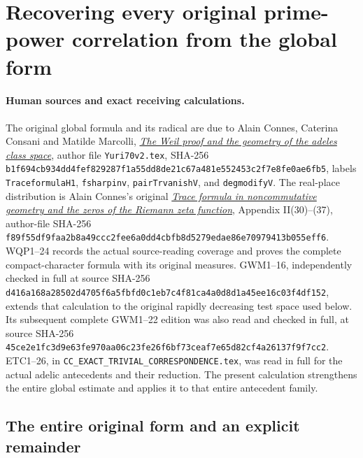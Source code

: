 \section{Recovering every original prime-power correlation from the global form}
\label{sec:global-weil-prime-frequency-recovery}

\paragraph{Human sources and exact receiving calculations.}
The original global formula and its radical are due to Alain Connes,
Caterina Consani and Matilde Marcolli,
\href{https://arxiv.org/abs/math/0703392v1}{\emph{The Weil proof and the
geometry of the adeles class space}}, author file
\nolinkurl{Yuri70v2.tex}, SHA-256
\nolinkurl{b1f694cb934dd4fef829287f1a55dd8de21c67a481e552453c2f7e8fe0ae6fb5},
labels \texttt{TraceformulaH1}, \texttt{fsharpinv},
\texttt{pairTrvanishV}, and \texttt{degmodifyV}.
The real-place distribution is Alain Connes's original
\href{https://arxiv.org/abs/math/9811068v1}{\emph{Trace formula in
noncommutative geometry and the zeros of the Riemann zeta function}},
Appendix II(30)--(37), author-file SHA-256
\nolinkurl{f89f55df9faa2b8a49ccc2fee6a0dd4cbfb8d5279edae86e70979413b055eff6}.
WQP1--24 records the actual source-reading coverage and proves the
complete compact-character formula with its original measures.
GWM1--16, independently checked in full at source SHA-256
\nolinkurl{d416a168a28502d4705f6a5fbfd0c1eb7c4f81ca4a0d8d1a45ee16c03f4df152},
extends that calculation to the original rapidly decreasing test
space used below. Its subsequent complete GWM1--22 edition was also
read and checked in full, at source SHA-256
\nolinkurl{45ce2e1fc3d9e63fe970aa06c23fe26f6bf73ceaf7e65d82cf4a26137f9f7cc2}.
ETC1--26, in
\nolinkurl{CC_EXACT_TRIVIAL_CORRESPONDENCE.tex}, was read in full
for the actual adelic antecedents and their reduction.
The present calculation strengthens the entire global estimate and
applies it to that entire antecedent family.

\subsection{The entire original form and an explicit remainder}

